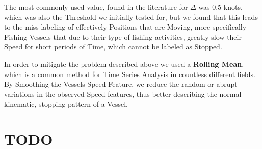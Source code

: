 The most commonly used value, found in the literature for $\Delta$ was 0.5 knots, which was also the Threshold we initially tested for, but we found that this leads to the miss-labeling of effectively Positions that are Moving, more specifically Fishing Vessels that due to their type of fishing activities, greatly slow their Speed for short periods of Time, which cannot be labeled as Stopped.

In order to mitigate the problem described above we used a \textbf{Rolling Mean}, which is a common method for Time Series Analysis in countless different fields.  By Smoothing the Vessels Speed Feature, we reduce the random or abrupt variations in the observed Speed features,  thus better describing the normal kinematic, stopping  pattern of a Vessel. 







\section{TODO}






